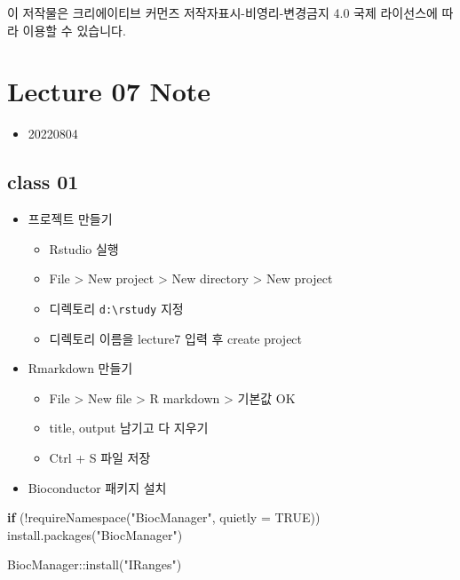 \documentclass[
]{book}
\newenvironment{Shaded}{\begin{snugshade}}{\end{snugshade}}
\newcommand{\AttributeTok}[1]{\textcolor[rgb]{0.77,0.63,0.00}{#1}}
\newcommand{\ConstantTok}[1]{\textcolor[rgb]{0.00,0.00,0.00}{#1}}
\newcommand{\ControlFlowTok}[1]{\textcolor[rgb]{0.13,0.29,0.53}{\textbf{#1}}}
\newcommand{\FunctionTok}[1]{\textcolor[rgb]{0.00,0.00,0.00}{#1}}
\newcommand{\NormalTok}[1]{#1}
\newcommand{\SpecialCharTok}[1]{\textcolor[rgb]{0.00,0.00,0.00}{#1}}
\newcommand{\StringTok}[1]{\textcolor[rgb]{0.31,0.60,0.02}{#1}}
\providecommand{\tightlist}{%
  \setlength{\itemsep}{0pt}\setlength{\parskip}{0pt}}
\begin{document}
이 저작물은 크리에이티브 커먼즈 저작자표시-비영리-변경금지 4.0 국제 라이선스에 따라 이용할 수 있습니다.

\hypertarget{lecture-07-note}{%
\chapter{Lecture 07 Note}\label{lecture-07-note}}

\begin{itemize}
\tightlist
\item
  20220804
\end{itemize}

\hypertarget{class-01-2}{%
\section{class 01}\label{class-01-2}}

\begin{itemize}
\tightlist
\item
  프로젝트 만들기

  \begin{itemize}
  \tightlist
  \item
    Rstudio 실행
  \item
    File \textgreater{} New project \textgreater{} New directory \textgreater{} New project
  \item
    디렉토리 \texttt{d:\textbackslash{}rstudy} 지정
  \item
    디렉토리 이름을 lecture7 입력 후 create project
  \end{itemize}
\item
  Rmarkdown 만들기

  \begin{itemize}
  \tightlist
  \item
    File \textgreater{} New file \textgreater{} R markdown \textgreater{} 기본값 OK
  \item
    title, output 남기고 다 지우기
  \item
    Ctrl + S 파일 저장
  \end{itemize}
\item
  Bioconductor 패키지 설치
\end{itemize}

\begin{Shaded}
\begin{Highlighting}[]
\ControlFlowTok{if}\NormalTok{ (}\SpecialCharTok{!}\FunctionTok{requireNamespace}\NormalTok{(}\StringTok{"BiocManager"}\NormalTok{, }\AttributeTok{quietly =} \ConstantTok{TRUE}\NormalTok{))}
    \FunctionTok{install.packages}\NormalTok{(}\StringTok{"BiocManager"}\NormalTok{)}

\NormalTok{BiocManager}\SpecialCharTok{::}\FunctionTok{install}\NormalTok{(}\StringTok{"IRanges"}\NormalTok{)}
\end{Highlighting}
\end{Shaded}
\end{document}
